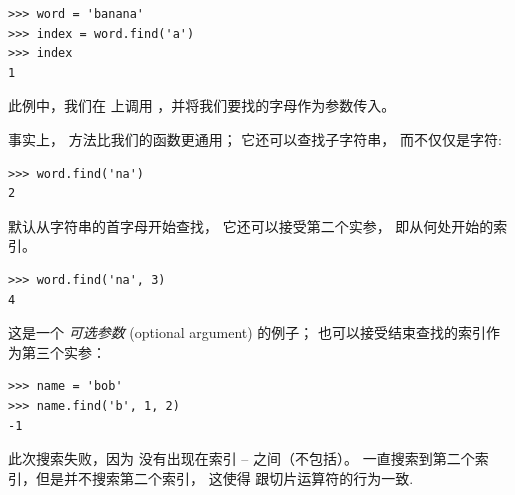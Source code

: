 \begin{lstlisting}
>>> word = 'banana'
>>> index = word.find('a')
>>> index
1
\end{lstlisting}

%

此例中，我们在  上调用  ，并将我们要找的字母作为参数传入。


事实上，  方法比我们的函数更通用； 它还可以查找子字符串， 而不仅仅是字符:

\begin{lstlisting}
>>> word.find('na')
2
\end{lstlisting}

%
  

 默认从字符串的首字母开始查找， 它还可以接受第二个实参， 即从何处开始的索引。

\begin{lstlisting}
>>> word.find('na', 3)
4
\end{lstlisting}

%

这是一个 {\em 可选参数} (optional argument) 的例子；  也可以接受结束查找的索引作为第三个实参：

\begin{lstlisting}
>>> name = 'bob'
>>> name.find('b', 1, 2)
-1
\end{lstlisting}

%

此次搜索失败，因为  没有出现在索引 -- 之间（不包括）。 一直搜索到第二个索引，但是并不搜索第二个索引， 这使得  跟切片运算符的行为一致.

